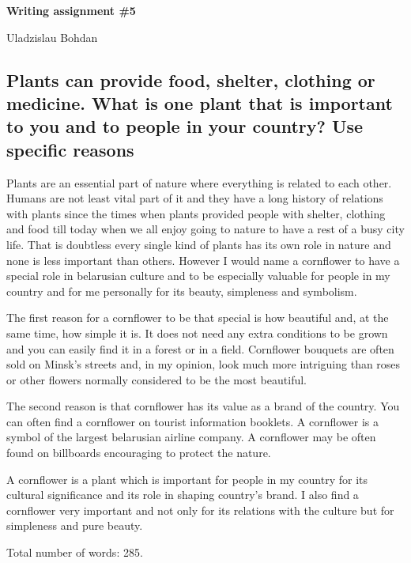 \documentclass[12pt]{article}
\begin{document}
{\Large

\textbf{Writing assignment \#5}

Uladzislau Bohdan

}

\vspace{10mm}

\subsection*{Plants can provide food, shelter, clothing or medicine. What is
one plant that is important to you and to people in your country?
Use specific reasons}

Plants are an essential part of nature where everything is related to each other.
Humans are not least vital part of it and they have a long history of relations with
plants since the times when plants provided people with shelter, clothing and food
till today when we all enjoy going to nature to have a rest of a busy city life.
That is doubtless every single kind of plants has its own role in nature and none
is less important than others. However I would name a cornflower to have a special role
in belarusian culture and to be especially valuable for people in my country and
for me personally for its beauty, simpleness and symbolism.

The first reason for a cornflower to be that special is how beautiful and, at the
same time, how simple it is. It does not need any extra conditions to be grown
and you can easily find it in a forest or in a field. Cornflower bouquets are
often sold on Minsk's streets and, in my opinion, look much more intriguing than
roses or other flowers normally considered to be the most beautiful.

The second reason is that cornflower has its value as a brand of the country.
You can often find a cornflower on tourist information booklets. A cornflower is
a symbol of the largest belarusian airline company. A cornflower may be often
found on billboards encouraging to protect the nature.

A cornflower is a plant which is important for people in my country for its cultural
significance and its role in shaping country's brand. I also find a cornflower
very important and not only for its relations with the culture but for simpleness
and pure beauty.

\vspace{15mm}

Total number of words: 285.
\end{document}

